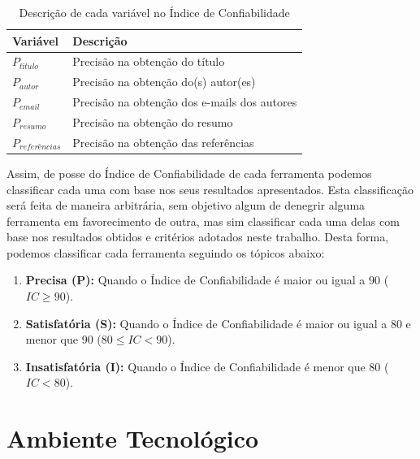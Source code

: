 \begin{table}
    \caption{Descrição de cada variável no Índice de Confiabilidade}
    \begin{center}
        \begin{tabular}{|p{3cm}|p{8cm}|}
            \hline \textbf{Variável} & \textbf{Descrição}\\ 
            \hline $P_{título}$ & Precisão na obtenção do título \\
            \hline $P_{autor}$ & Precisão na obtenção do(s) autor(es)\\
            \hline $P_{email}$ & Precisão na obtenção dos e-mails dos autores \\
            \hline $P_{resumo}$ & Precisão na obtenção do resumo \\
            \hline $P_{referências}$ & Precisão na obtenção das referências \\
            \hline 
        \end{tabular} 
    \end{center}
    \label{tab:confiability-index}
\end{table}

\newpage

Assim, de posse do Índice de Confiabilidade de cada ferramenta podemos classificar cada uma com base nos seus resultados apresentados. Esta classificação será feita de maneira arbitrária, sem objetivo algum de denegrir alguma ferramenta em favorecimento de outra, mas sim classificar cada uma delas com base nos resultados obtidos e critérios adotados neste trabalho. Desta forma, podemos classificar cada ferramenta seguindo os tópicos abaixo:

\begin{enumerate}
    \item \textbf{Precisa (P):} Quando o Índice de Confiabilidade é maior ou igual a 90 ($IC\geq90$).
    \item \textbf{Satisfatória (S):} Quando o Índice de Confiabilidade é maior ou igual a 80 e menor que 90 ($80 \leq IC < 90$).
    \item \textbf{Insatisfatória (I):} Quando o Índice de Confiabilidade é menor que 80 ($IC < 80$).
\end{enumerate}

\section{Ambiente Tecnológico}
\label{sec:tech-environment}

